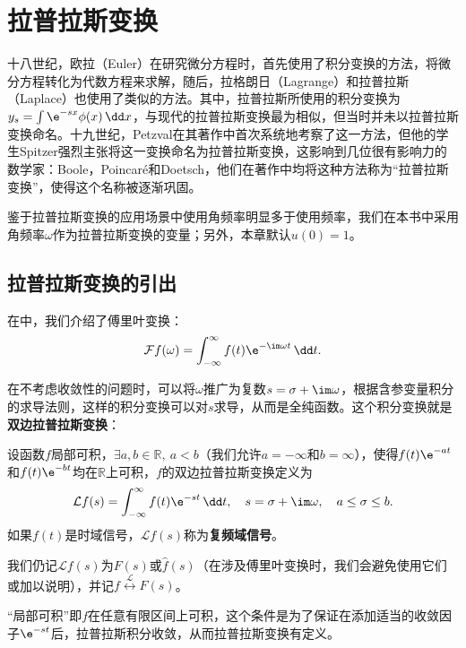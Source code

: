 \section{拉普拉斯变换}\label{sec:Laplace_Transform}

十八世纪，欧拉（Euler）在研究微分方程时，首先使用了积分变换的方法，将微分方程转化为代数方程来求解，随后，拉格朗日（Lagrange）和拉普拉斯（Laplace）也使用了类似的方法。其中，拉普拉斯所使用的积分变换为$y_s=\int \e^{-sx}\phi(x)\,\dd x$，与现代的拉普拉斯变换最为相似，但当时并未以拉普拉斯变换命名。十九世纪，Petzval在其著作中首次系统地考察了这一方法，但他的学生Spitzer强烈主张将这一变换命名为拉普拉斯变换，这影响到几位很有影响力的数学家：Boole，Poincaré和Doetsch，他们在著作中均将这种方法称为“拉普拉斯变换”，使得这个名称被逐渐巩固。


鉴于拉普拉斯变换的应用场景中使用角频率明显多于使用频率，我们在本书中采用角频率$\omega$作为拉普拉斯变换的变量；另外，本章默认$u(0)=1$。

\subsection{拉普拉斯变换的引出}\label{sub:introduction_of_laplace}
在中，我们介绍了傅里叶变换：
\begin{equation}
    \mathcal{F}f(\omega)=\int_{-\infty}^{\infty}f(t)\e^{-\im\omega t}\,\dd t.
\end{equation}

在不考虑收敛性的问题时，可以将$\omega$推广为复数$s=\sigma+\im\omega$，根据含参变量积分的求导法则，这样的积分变换可以对$s$求导，从而是全纯函数。这个积分变换就是\textbf{双边拉普拉斯变换}：
\begin{definition}[双边拉普拉斯变换]
    \label{def:bi_laplace}
    设函数$f$局部可积，$\exists a,b\in\mathbb{R},\ a<b$（我们允许$a=-\infty$和$b=\infty$），使得$f(t)\e^{-at}$和$f(t)\e^{-bt}$均在$\mathbb{R}$上可积，$f$的双边拉普拉斯变换定义为
    \begin{equation}
        \mathcal{L}f(s)=\int_{-\infty}^{\infty}f(t)\e^{-st}\,\dd t,\quad s=\sigma+\im\omega,\quad a\le\sigma\le b.
    \end{equation}
    如果$f(t)$是时域信号，$\mathcal{L}f(s)$称为\textbf{复频域信号}。

    我们仍记$\mathcal{L}f(s)$为$F(s)$或$\hat{f}(s)$（在涉及傅里叶变换时，我们会避免使用它们或加以说明），并记$f\overset{\mathcal{L}}{\longleftrightarrow}F(s)$。
\end{definition}
“局部可积”即$f$在任意有限区间上可积，这个条件是为了保证在添加适当的收敛因子$\e^{-st}$后，拉普拉斯积分收敛，从而拉普拉斯变换有定义。

